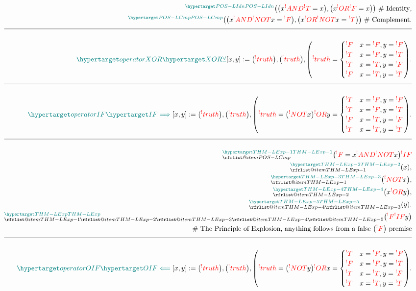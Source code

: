 \documentclass[a4paper]{article}
\makeatletter
\def\ml{\mleft}
\def\mr{\mright}
\newcommand{\defeq}{:=}
\newcommand{\cusand}{,}
\newcommand{\cuspop}{.}
\newcommand{\eqComment}[1]{\text{  \# #1}}
\newcommand{\n}{\\[1.5ex] \hline \nonumber \\[0ex]}
\newcommand{\m}{\nonumber \\}
\newcommand\rfrlist[1]{%
    \forcsvlist{\rfrlist@item}{#1}
}
\newcommand\rfrlist@item[1]{\rfr{#1}\\}
\newcommand{\thmlink}[2]{{}_{\substack{\rfrlist{#1}}}^{\dfn{#2}} }
\makeatother
\begin{document}
\begin{tcolorbox}
\begin{align}
\m \thmlink{}{POS-LIdn} \ml(\ml(x \rfr{AND} \rfr{T} = x\mr) \cusand \ml(x \rfr{OR} \rfr{F} = x\mr)\mr) \eqComment{Identity} \cusand
\m \thmlink{}{POS-LCmp} \ml(\ml(x \rfr{AND} \rfr{NOT} x = \rfr{F}\mr) \cusand \ml(x \rfr{OR} \rfr{NOT} x = \rfr{T}\mr)\mr) \eqComment{Complement} \cuspop
\n \dfn{operatorXOR} [\dfn{XOR}[\veebar]][x, y] \defeq \ml(\rfr{truth} [x][]\mr) \cusand \ml(\rfr{truth} [y][]\mr) \cusand \ml(\rfr{truth} [x \rfr{XOR} y][] = \begin{cases} \rfr{F} & x = \rfr{F} \cusand y = \rfr{F} \\ \rfr{T} & x = \rfr{F} \cusand y = \rfr{T} \\ \rfr{T} & x = \rfr{T} \cusand y = \rfr{F} \\ \rfr{F} & x = \rfr{T} \cusand y = \rfr{T} \end{cases}\mr) \cuspop
\n \dfn{operatorIF} [\dfn{IF}[\implies]][x, y] \defeq \ml(\rfr{truth} [x][]\mr) \cusand \ml(\rfr{truth} [y][]\mr) \cusand \ml(\rfr{truth} [x \rfr{IF} y][] = \ml(\rfr{NOT} x\mr) \rfr{OR} y = \begin{cases} \rfr{T} & x = \rfr{F} \cusand y = \rfr{F} \\ \rfr{T} & x = \rfr{F} \cusand y = \rfr{T} \\ \rfr{F} & x = \rfr{T} \cusand y = \rfr{F} \\ \rfr{T} & x = \rfr{T} \cusand y = \rfr{T} \end{cases}\mr) \cuspop
\n \thmlink{POS-LCmp}{THM-LExp-1} \ml(\rfr{F} = x \rfr{AND} \rfr{NOT} x\mr) \rfr{IF}
\m \thmlink{THM-LExp-1}{THM-LExp-2} \ml(x\mr) \cusand
\m \thmlink{THM-LExp-1}{THM-LExp-3} \ml(\rfr{NOT} x\mr) \cusand
\m \thmlink{THM-LExp-2}{THM-LExp-4} \ml(x \rfr{OR} y\mr) \cusand
\m \thmlink{THM-LExp-4, THM-LExp-3}{THM-LExp-5} \ml(y\mr) \cuspop
\m \thmlink{THM-LExp-1, THM-LExp-2, THM-LExp-3, THM-LExp-4, THM-LExp-5}{THM-LExp} \ml(\rfr{F} \rfr{IF} y\mr)
\m \eqComment{The Principle of Explosion, anything follows from a false $\ml(\rfr{F}\mr)$ premise}
\n \dfn{operatorOIF} [\dfn{OIF}[\impliedby]][x, y] \defeq \ml(\rfr{truth} [x][]\mr) \cusand \ml(\rfr{truth} [y][]\mr) \cusand \ml(\rfr{truth} [x \rfr{OIF} y][] = \ml(\rfr{NOT} y\mr) \rfr{OR} x = \begin{cases} \rfr{T} & x = \rfr{F} \cusand y = \rfr{F} \\ \rfr{F} & x = \rfr{F} \cusand y = \rfr{T} \\ \rfr{T} & x = \rfr{T} \cusand y = \rfr{F} \\ \rfr{T} & x = \rfr{T} \cusand y = \rfr{T} \end{cases}\mr) \cuspop

\end{align}
\end{tcolorbox}
\end{document}

